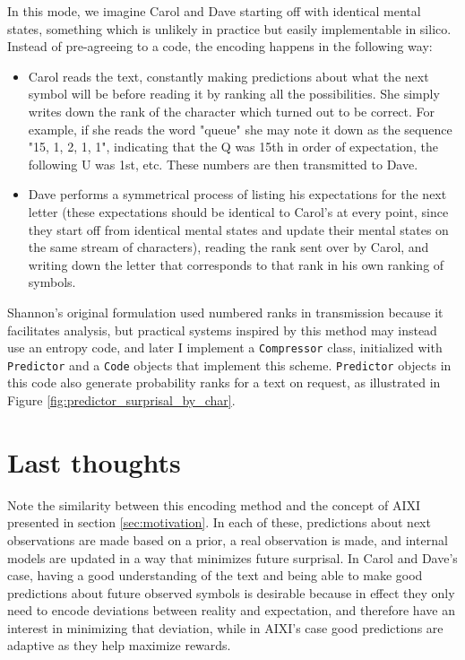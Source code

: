 In this mode, we imagine Carol and Dave starting off with identical mental states, something which is unlikely in practice but easily implementable in silico. Instead of pre-agreeing to a code, the encoding happens in the following way:
\begin{itemize}
    \item Carol reads the text, constantly making predictions about what the next symbol will be before reading it by ranking all the possibilities. She simply writes down the rank of the character which turned out to be correct. For example, if she reads the word "queue" she may note it down as the sequence "15, 1, 2, 1, 1", indicating that the Q was 15th in order of expectation, the following U was 1st, etc. These numbers are then transmitted to Dave.
    \item Dave performs a symmetrical process of listing his expectations for the next letter (these expectations should be identical to Carol's at every point, since they start off from identical mental states and update their mental states on the same stream of characters), reading the rank sent over by Carol, and writing down the letter that corresponds to that rank in his own ranking of symbols.
\end{itemize}

Shannon's original formulation used numbered ranks in transmission because it facilitates analysis, but practical systems inspired by this method may instead use an entropy code, and later I implement a \texttt{Compressor} class, initialized with \texttt{Predictor} and a \texttt{Code} objects that implement this scheme. \texttt{Predictor} objects in this code also generate probability ranks for a text on request, as illustrated in Figure \ref{fig:predictor_surprisal_by_char}.

\section{Last thoughts}

Note the similarity between this encoding method and the concept of AIXI presented in section \ref{sec:motivation}. In each of these, predictions about next observations are made based on a prior, a real observation is made, and internal models are updated in a way that minimizes future surprisal. In Carol and Dave's case, having a good understanding of the text and being able to make good predictions about future observed symbols is desirable because in effect they only need to encode deviations between reality and expectation, and therefore have an interest in minimizing that deviation, while in AIXI's case good predictions are adaptive as they help maximize rewards.

